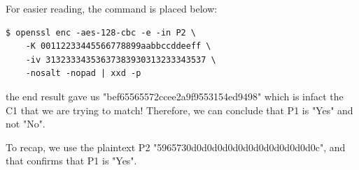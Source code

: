 \documentclass[12pt]{article}
\begin{document}
For easier reading, the command is placed below:

\begin{verbatim}
$ openssl enc -aes-128-cbc -e -in P2 \
    -K 00112233445566778899aabbccddeeff \
    -iv 31323334353637383930313233343537 \
    -nosalt -nopad | xxd -p
\end{verbatim}

the end result gave us "bef65565572ccee2a9f9553154ed9498" which is infact the C1 that we are trying to match! Therefore, we can conclude that P1 is "Yes" and not "No".

To recap, we use the plaintext P2 "5965730d0d0d0d0d0d0d0d0d0d0d0d0c", and that confirms that P1 is "Yes".
\end{document}
